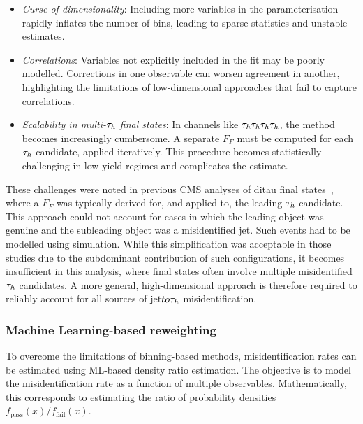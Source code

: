 \begin{itemize}
\item \textit{Curse of dimensionality}: Including more variables in the parameterisation rapidly inflates the number of bins, leading to sparse statistics and unstable estimates.

\item \textit{Correlations}: Variables not explicitly included in the fit may be poorly modelled. Corrections in one observable can worsen agreement in another, highlighting the limitations of low-dimensional approaches that fail to capture correlations.

\item \textit{Scalability in multi-$\tau_h$ final states}: In channels like $\tau_h \tau_h \tau_h \tau_h$, the method becomes increasingly cumbersome. A separate $F_F$ must be computed for each $\tau_h$ candidate, applied iteratively. This procedure becomes statistically challenging in low-yield regimes and complicates the estimate.
\end{itemize}

These challenges were noted in previous CMS analyses of ditau final states~\cite{CMS:2022goy,Mb:2022rxu}, where a $F_F$ was typically derived for, and applied to, the leading $\tau_h$ candidate. This approach could not account for cases in which the leading object was genuine and the subleading object was a misidentified jet. Such events had to be modelled using simulation. While this simplification was acceptable in those studies due to the subdominant contribution of such configurations, it becomes insufficient in this analysis, where final states often involve multiple misidentified $\tau_h$ candidates. A more general, high-dimensional approach is therefore required to reliably account for all sources of jet$to\tau_h$ misidentification.


\subsubsection{Machine Learning-based reweighting}
\label{Section:Chapter6_FakeFactors_BDT}

To overcome the limitations of binning-based methods, misidentification rates can be estimated using \ac{ML}-based density ratio estimation. The objective is to model the misidentification rate as a function of multiple observables. Mathematically, this corresponds to estimating the ratio of probability densities $f_{\text{pass}}(x)/f_{\text{fail}}(x)$.

